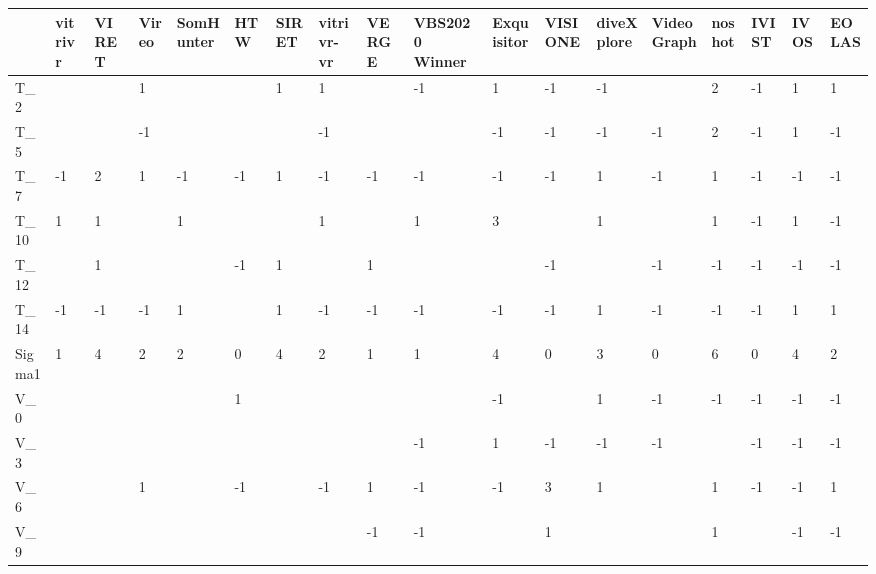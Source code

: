 \begin{tabular}{llllllllllllllllll}
\toprule
{} & vitrivr & VIRET & Vireo & SomHunter &  HTW & SIRET & vitrivr-vr & VERGE & VBS2020 Winner & Exquisitor & VISIONE & diveXplore & VideoGraph & noshot & IVIST & IVOS & EOLAS \\
\midrule
T\_2    &         &       &     1 &           &      &     1 &          1 &       &             -1 &          1 &      -1 &         -1 &            &      2 &    -1 &    1 &     1 \\
T\_5    &         &       &    -1 &           &      &       &         -1 &       &                &         -1 &      -1 &         -1 &         -1 &      2 &    -1 &    1 &    -1 \\
T\_7    &      -1 &     2 &     1 &        -1 &   -1 &     1 &         -1 &    -1 &             -1 &         -1 &      -1 &          1 &         -1 &      1 &    -1 &   -1 &    -1 \\
T\_10   &       1 &     1 &       &         1 &      &       &          1 &       &              1 &          3 &         &          1 &            &      1 &    -1 &    1 &    -1 \\
T\_12   &         &     1 &       &           &   -1 &     1 &            &     1 &                &            &      -1 &            &         -1 &     -1 &    -1 &   -1 &    -1 \\
T\_14   &      -1 &    -1 &    -1 &         1 &      &     1 &         -1 &    -1 &             -1 &         -1 &      -1 &          1 &         -1 &     -1 &    -1 &    1 &     1 \\
Sigma1 &       1 &     4 &     2 &         2 &    0 &     4 &          2 &     1 &              1 &          4 &       0 &          3 &          0 &      6 &     0 &    4 &     2 \\
V\_0    &         &       &       &           &    1 &       &            &       &                &         -1 &         &          1 &         -1 &     -1 &    -1 &   -1 &    -1 \\
V\_3    &         &       &       &           &      &       &            &       &             -1 &          1 &      -1 &         -1 &         -1 &        &    -1 &   -1 &    -1 \\
V\_6    &         &       &     1 &           &   -1 &       &         -1 &     1 &             -1 &         -1 &       3 &          1 &            &      1 &    -1 &   -1 &     1 \\
V\_9    &         &       &       &           &      &       &            &    -1 &             -1 &            &       1 &            &            &      1 &       &   -1 &    -1 \\

\end{tabular}
